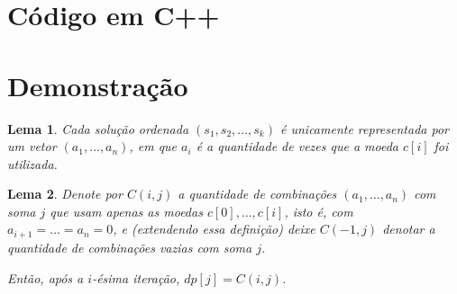 \documentclass{article}
\newtheorem{lemma}{Lema}[section]
\begin{document}
\section{Código em C++}


\section{Demonstração}
\begin{lemma}
	Cada solução ordenada \((s_1, s_2, \dotsc, s_k)\) é unicamente representada por um vetor \((a_1, \dotsc, a_n)\), em que \(a_i\) é a quantidade de vezes que a moeda \(c[i]\) foi utilizada.
\end{lemma}

\begin{lemma}
	Denote por \(C(i, j)\) a quantidade de combinações \((a_1, \dotsc, a_n)\) com soma \(j\) que usam apenas as moedas \(c[0], \dotsc, c[i]\), isto é, com \(a_{i+1} = \dotsc = a_n = 0\), e (extendendo essa definição) deixe \(C(-1, j)\) denotar a quantidade de combinações vazias com soma \(j\).

	Então, após a \(i\)-ésima iteração, \(dp[j] = C(i, j)\). 
\end{lemma}
\end{document}

